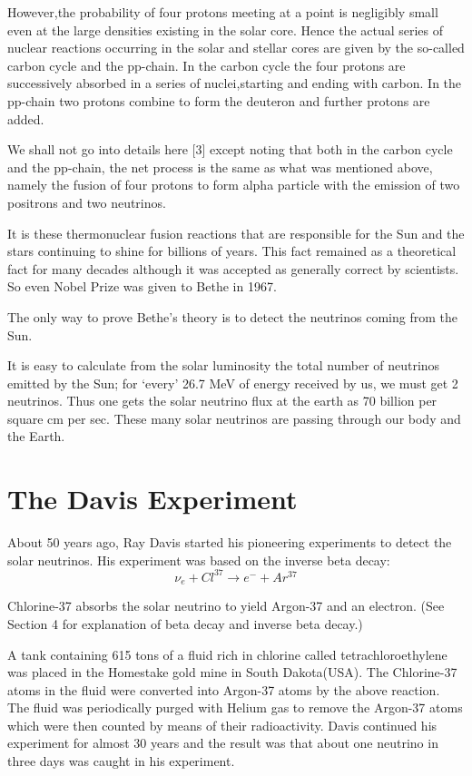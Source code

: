 However,the probability of four protons meeting at a point is negligibly
small even at the large densities existing in the solar core. Hence the actual
series of nuclear reactions occurring in the solar and stellar cores are given
by the so-called carbon cycle and the pp-chain. In the carbon cycle the four
protons are successively absorbed in a series of nuclei,starting and ending
with carbon. In the pp-chain two protons combine to form the deuteron and
further protons are added.

We shall not go into details here [3] except noting that both in the carbon
cycle and the pp-chain, the net process is the same as what was mentioned
above, namely the fusion of four protons to form alpha particle with the
emission of two positrons and two neutrinos.

It is these thermonuclear fusion reactions that are responsible for the Sun
and the stars continuing to shine for billions of years. This fact remained as a theoretical fact for many decades although it was accepted as generally
correct by scientists. So even Nobel Prize was given to Bethe in 1967.

The only way to prove Bethe’s theory is to detect the neutrinos coming
from the Sun.

It is easy to calculate from the solar luminosity the total number of neutrinos emitted by the Sun; for ‘every’ 26.7 MeV of energy received by us,
we must get 2 neutrinos. Thus one gets the solar neutrino flux at the earth
as 70 billion per square cm per sec. These many solar neutrinos are passing
through our body and the Earth.

\section{The Davis Experiment}

About 50 years ago, Ray Davis started his pioneering experiments to
detect the solar neutrinos. His experiment was based on the inverse beta
decay:
$$
\nu_{e} + Cl^{37} \rightarrow e^{-} + Ar^{37}
$$

Chlorine-37 absorbs the solar neutrino to yield Argon-37 and an electron.
(See Section 4 for explanation of beta decay and inverse beta decay.)

A tank containing 615 tons of a fluid rich in chlorine called tetrachloroethylene was placed in the Homestake gold mine in South Dakota(USA). The
Chlorine-37 atoms in the fluid were converted into Argon-37 atoms by the
above reaction. The fluid was periodically purged with Helium gas to remove
the Argon-37 atoms which were then counted by means of their radioactivity.
Davis continued his experiment for almost 30 years and the result was that
about one neutrino in three days was caught in his experiment.

